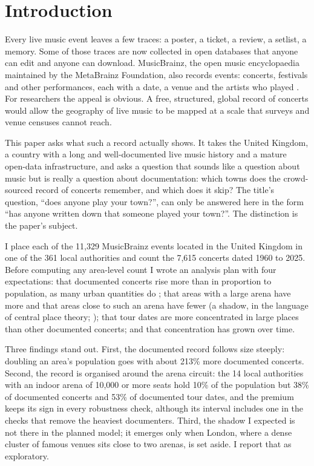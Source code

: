 \documentclass[11pt,a4paper]{article}
\begin{document}
\section{Introduction}\label{sec:intro}
Every live music event leaves a few traces: a poster, a ticket, a review, a setlist, a memory. Some of those traces are now collected in open databases that anyone can edit and anyone can download. MusicBrainz, the open music encyclopaedia maintained by the MetaBrainz Foundation, also records events: concerts, festivals and other performances, each with a date, a venue and the artists who played \citep{metabrainz2026}. For researchers the appeal is obvious. A free, structured, global record of concerts would allow the geography of live music to be mapped at a scale that surveys and venue censuses cannot reach.

This paper asks what such a record actually shows. It takes the United Kingdom, a country with a long and well-documented live music history \citep{frith2013,frith2021} and a mature open-data infrastructure, and asks a question that sounds like a question about music but is really a question about documentation: which towns does the crowd-sourced record of concerts remember, and which does it skip? The title's question, ``does anyone play your town?'', can only be answered here in the form ``has anyone written down that someone played your town?''. The distinction is the paper's subject.

I place each of the 11,329 MusicBrainz events located in the United Kingdom in one of the 361 local authorities and count the 7,615 concerts dated 1960 to 2025. Before computing any area-level count I wrote an analysis plan with four expectations: that documented concerts rise more than in proportion to population, as many urban quantities do \citep{bettencourt2007}; that areas with a large arena have more and that areas close to such an arena have fewer (a shadow, in the language of central place theory; \citealp{christaller1966}); that tour dates are more concentrated in large places than other documented concerts; and that concentration has grown over time.

Three findings stand out. First, the documented record follows size steeply: doubling an area's population goes with about 213\% more documented concerts. Second, the record is organised around the arena circuit: the 14 local authorities with an indoor arena of 10,000 or more seats hold 10\% of the population but 38\% of documented concerts and 53\% of documented tour dates, and the premium keeps its sign in every robustness check, although its interval includes one in the checks that remove the heaviest documenters. Third, the shadow I expected is not there in the planned model; it emerges only when London, where a dense cluster of famous venues sits close to two arenas, is set aside. I report that as exploratory.
\end{document}
